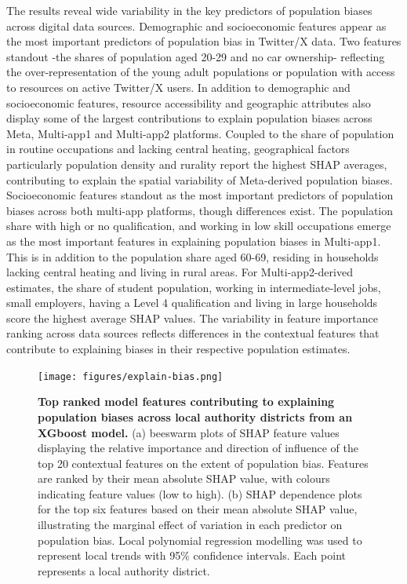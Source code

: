 \documentclass{article}
\begin{document}
The results reveal wide variability in the key predictors of population
biases across digital data sources. Demographic and socioeconomic
features appear as the most important predictors of population bias in
Twitter/X data. Two features standout -the shares of population aged
20-29 and no car ownership- reflecting the over-representation of the
young adult populations or population with access to resources on active
Twitter/X users. In addition to demographic and socioeconomic features,
resource accessibility and geographic attributes also display some of
the largest contributions to explain population biases across Meta,
Multi-app1 and Multi-app2 platforms. Coupled to the share of population
in routine occupations and lacking central heating, geographical factors
particularly population density and rurality report the highest SHAP
averages, contributing to explain the spatial variability of
Meta-derived population biases. Socioeconomic features standout as the
most important predictors of population biases across both multi-app
platforms, though differences exist. The population share with high or
no qualification, and working in low skill occupations emerge as the
most important features in explaining population biases in Multi-app1.
This is in addition to the population share aged 60-69, residing in
households lacking central heating and living in rural areas. For
Multi-app2-derived estimates, the share of student population, working
in intermediate-level jobs, small employers, having a Level 4
qualification and living in large households score the highest average
SHAP values. The variability in feature importance ranking across data
sources reflects differences in the contextual features that contribute
to explaining biases in their respective population estimates.

\begin{figure}
\centering
\texttt{[image: figures/explain-bias.png]}
\caption{\textbf{Top ranked model features contributing to explaining population
biases across local authority districts from an XGboost model.} (a)
beeswarm plots of SHAP feature values displaying the relative importance
and direction of influence of the top 20 contextual features on the
extent of population bias. Features are ranked by their mean absolute
SHAP value, with colours indicating feature values (low to high). (b)
SHAP dependence plots for the top six features based on their mean
absolute SHAP value, illustrating the marginal effect of variation in
each predictor on population bias. Local polynomial regression modelling
was used to represent local trends with 95\% confidence intervals. Each
point represents a local authority
district.}\label{fig:shap-plots}
\end{figure}
\end{document}
